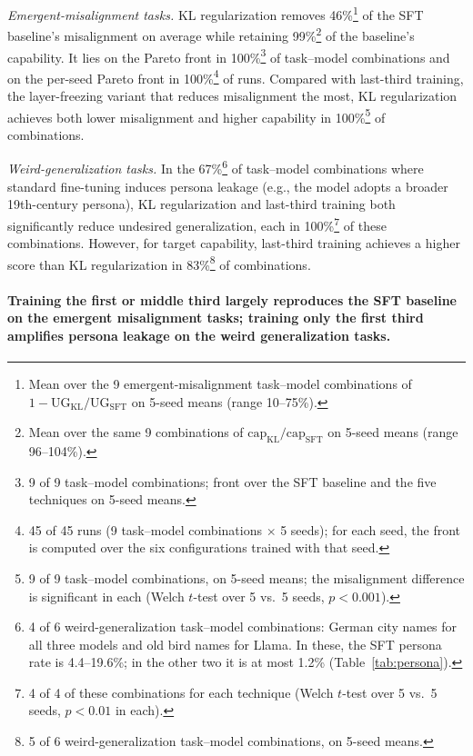 \documentclass[11pt]{article}
\newenvironment{subpoints}%
  {\begin{list}{}{\setlength{\leftmargin}{1.5em}\setlength{\topsep}{4pt}%
   \setlength{\itemsep}{6pt}\setlength{\parsep}{0pt}\setlength{\labelwidth}{0pt}%
   \setlength{\labelsep}{0pt}}}%
  {\end{list}}
\begin{document}
\begin{subpoints}
\item \emph{Emergent-misalignment tasks.} KL regularization removes 46\%\footnote{Mean over the 9
emergent-misalignment task--model combinations of
$1 - \mathrm{UG}_{\mathrm{KL}}/\mathrm{UG}_{\mathrm{SFT}}$ on 5-seed means (range 10--75\%).} of
the SFT baseline's misalignment on average while retaining 99\%\footnote{Mean over the same 9
combinations of $\mathrm{cap}_{\mathrm{KL}}/\mathrm{cap}_{\mathrm{SFT}}$ on 5-seed means (range
96--104\%).} of the baseline's capability. It lies on the Pareto front in 100\%\footnote{9 of 9
task--model combinations; front over the SFT baseline and the five techniques on 5-seed means.}
of task--model combinations and on the per-seed Pareto front in 100\%\footnote{45 of 45 runs
(9 task--model combinations $\times$ 5 seeds); for each seed, the front is computed over the six
configurations trained with that seed.} of runs. Compared with last-third training, the
layer-freezing variant that reduces misalignment the most, KL regularization achieves both lower
misalignment and higher capability in 100\%\footnote{9 of 9 task--model combinations, on 5-seed
means; the misalignment difference is significant in each (Welch $t$-test over 5 vs.\ 5 seeds,
$p < 0.001$).} of combinations.

\item \emph{Weird-generalization tasks.} In the 67\%\footnote{4 of 6 weird-generalization task--model
combinations: German city names for all three models and old bird names for Llama. In these, the
SFT persona rate is 4.4--19.6\%; in the other two it is at most 1.2\% (Table~\ref{tab:persona}).}
of task--model combinations where standard fine-tuning induces persona leakage (e.g., the model
adopts a broader 19th-century persona), KL regularization and last-third training both
significantly reduce undesired generalization, each in 100\%\footnote{4 of 4 of these
combinations for each technique (Welch $t$-test over 5 vs.\ 5 seeds, $p < 0.01$ in each).} of
these combinations. However, for target capability, last-third training achieves a higher score
than KL regularization in 83\%\footnote{5 of 6 weird-generalization task--model combinations, on
5-seed means.} of combinations.
\end{subpoints}

\paragraph{Training the first or middle third largely reproduces the SFT baseline on the emergent
misalignment tasks; training only the first third amplifies persona leakage on the weird
generalization tasks.}
\end{document}
